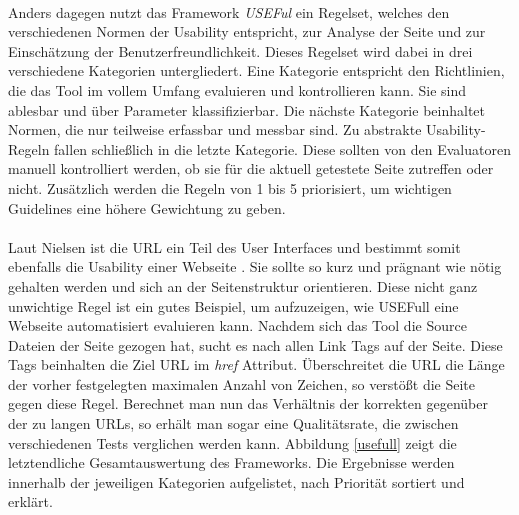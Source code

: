 \\
Anders dagegen nutzt das Framework \textit{USEFul} ein Regelset, welches den verschiedenen Normen der Usability entspricht, zur Analyse der Seite und zur Einschätzung der Benutzerfreundlichkeit. Dieses Regelset wird dabei in drei verschiedene Kategorien untergliedert. Eine Kategorie entspricht den Richtlinien, die das Tool im vollem Umfang evaluieren und kontrollieren kann. Sie sind ablesbar und über Parameter klassifizierbar. Die nächste Kategorie beinhaltet Normen, die nur teilweise erfassbar und messbar sind. Zu abstrakte Usability-Regeln fallen schließlich in die letzte Kategorie. Diese sollten von den Evaluatoren manuell kontrolliert werden, ob sie für die aktuell getestete Seite zutreffen oder nicht. Zusätzlich werden die Regeln von 1 bis 5 priorisiert, um wichtigen Guidelines eine höhere Gewichtung zu geben.\\
\\
Laut Nielsen ist die URL ein Teil des User Interfaces und bestimmt somit ebenfalls die Usability einer Webseite \cite{urlasui}. Sie sollte so kurz und prägnant wie nötig gehalten werden und sich an der Seitenstruktur orientieren. Diese nicht ganz unwichtige Regel ist ein gutes Beispiel, um aufzuzeigen, wie USEFull eine Webseite automatisiert evaluieren kann. Nachdem sich das Tool die Source Dateien der Seite gezogen hat, sucht es nach allen Link Tags auf der Seite. Diese Tags beinhalten die Ziel URL im \textit{href} Attribut. Überschreitet die URL die Länge der vorher festgelegten maximalen Anzahl von Zeichen, so verstößt die Seite gegen diese Regel. Berechnet man nun das Verhältnis der korrekten gegenüber der zu langen URLs, so erhält man sogar eine Qualitätsrate, die zwischen verschiedenen Tests verglichen werden kann. Abbildung \ref{usefull} zeigt die letztendliche Gesamtauswertung des Frameworks. Die Ergebnisse werden innerhalb der jeweiligen Kategorien aufgelistet, nach Priorität sortiert und erklärt.

